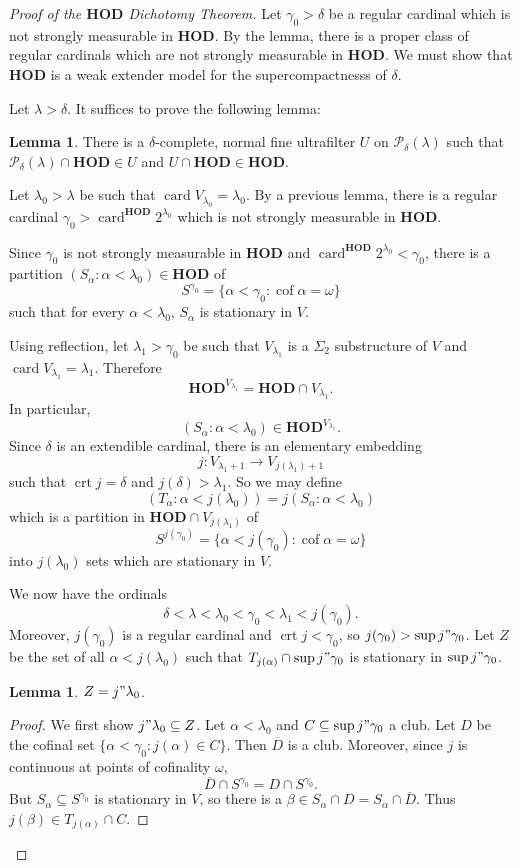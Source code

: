 \documentclass[12pt]{report}
\newcommand{\card}{\operatorname{card}}
\newcommand{\pset}{\mathcal{P}}
\newcommand{\HOD}{\mathbf{HOD}}
\DeclareMathOperator{\cof}{cof}
\DeclareMathOperator{\crt}{crt}
\theoremstyle{definition}
\newtheorem{lemma}[theorem]{Lemma}
\begin{document}
\begin{proof}[Proof of the $\HOD$ Dichotomy Theorem]
Let $\gamma_0 > \delta$ be a regular cardinal which is not strongly measurable in $\HOD$.
By the lemma, there is a proper class of regular cardinals which are not strongly measurable in $\HOD$.
We must show that $\HOD$ is a weak extender model for the supercompactnesss of $\delta$.

Let $\lambda > \delta$. It suffices to prove the following lemma:
\begin{lemma}
There is a $\delta$-complete, normal fine ultrafilter $U$ on $\pset_\delta(\lambda)$ such that $\pset_\delta(\lambda) \cap \HOD \in U$ and $U \cap \HOD \in \HOD$.
\end{lemma}
Let $\lambda_0 > \lambda$ be such that $\card V_{\lambda_0} = \lambda_0$.
By a previous lemma, there is a regular cardinal $\gamma_0 > \card^\HOD 2^{\lambda_0}$ which is not strongly measurable in $\HOD$.

Since $\gamma_0$ is not strongly measurable in $\HOD$ and $\card^\HOD 2^{\lambda_0} < \gamma_0$, there is a partition $(S_\alpha: \alpha < \lambda_0) \in \HOD$ of
$$S^{\gamma_0} = \{\alpha < \gamma_0: \cof \alpha = \omega\}$$
such that for every $\alpha < \lambda_0$, $S_\alpha$ is stationary in $V$.

Using reflection, let $\lambda_1 > \gamma_0$ be such that $V_{\lambda_1}$ is a $\Sigma_2$ substructure of $V$ and $\card V_{\lambda_1} = \lambda_1$. Therefore
$$\HOD^{V_{\lambda_1}} = \HOD \cap V_{\lambda_1}.$$
In particular,
$$(S_\alpha: \alpha < \lambda_0) \in \HOD^{V_{\lambda_1}}.$$
Since $\delta$ is an extendible cardinal, there is an elementary embedding
$$j: V_{\lambda_1 + 1} \to V_{j(\lambda_1) + 1}$$
such that $\crt j = \delta$ and $j(\delta) > \lambda_1$.
So we may define
$$(T_\alpha: \alpha < j(\lambda_0)) = j(S_\alpha: \alpha < \lambda_0)$$
which is a partition in $\HOD \cap V_{j(\lambda_1)}$ of
$$S^{j(\gamma_0)} = \{\alpha < j(\gamma_0): \cof \alpha = \omega\}$$
into $j(\lambda_0)$ sets which are stationary in $V$.

We now have the ordinals
$$\delta < \lambda < \lambda_0 < \gamma_0 < \lambda_1 < j(\gamma_0).$$
Moreover, $j(\gamma_0)$ is a regular cardinal and $\crt j < \gamma_0$, so $j(\gamma_0) > \sup j"\gamma_0$.
Let $Z$ be the set of all $\alpha < j(\lambda_0)$ such that $T_{j(\alpha)} \cap \sup j"\gamma_0$ is stationary in $\sup j"\gamma_0$.
\begin{lemma}
$Z = j"\lambda_0$.
\end{lemma}
\begin{proof}
We first show $j"\lambda_0 \subseteq Z$. Let $\alpha < \lambda_0$ and $C \subseteq \sup j"\gamma_0$ a club.
Let $D$ be the cofinal set $\{\alpha < \gamma_0: j(\alpha) \in C\}$. Then $\overline D$ is a club.
Moreover, since $j$ is continuous at points of cofinality $\omega$,
$$\overline D \cap S^{\gamma_0} = D \cap S^{\gamma_0}.$$
But $S_\alpha \subseteq S^{\gamma_0}$ is stationary in $V$, so there is a $\beta \in S_\alpha \cap D = S_\alpha \cap \overline D$.
Thus $j(\beta) \in T_{j(\alpha)} \cap C$.


\end{proof}
\end{proof}
\end{document}
